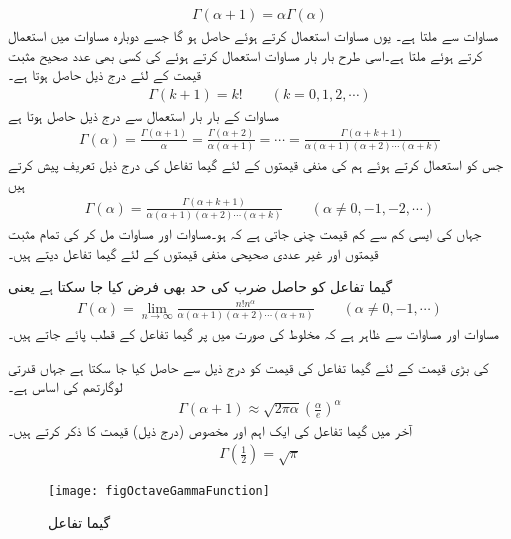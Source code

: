 \begin{align}\label{مساوات_ضمیمہ_گیما_تکمل_ب}
\Gamma(\alpha+1)=\alpha\Gamma(\alpha)
\end{align}
مساوات  سے  ملتا ہے۔ یوں مساوات  استعمال کرتے ہوئے  حاصل ہو گا جسے دوبارہ مساوات  میں استعمال کرتے ہوئے  ملتا ہے۔اسی طرح بار بار مساوات  استعمال کرتے ہوئے  کی کسی بھی عدد صحیح مثبت قیمت  کے لئے درج ذیل حاصل ہوتا ہے۔
\begin{align}\label{مساوات_ضمیمہ_گیما_تکمل_پ}
\Gamma(k+1)=k!\quad \quad (k=0,1,2,\cdots)
\end{align} 
مساوات  کے بار بار استعمال سے  درج ذیل حاصل ہوتا ہے
\begin{align*}
\Gamma(\alpha)=\frac{\Gamma(\alpha+1)}{\alpha}=\frac{\Gamma(\alpha+2)}{\alpha(\alpha+1)}=\cdots=\frac{\Gamma(\alpha+k+1)}{\alpha(\alpha+1)(\alpha+2)\cdots(\alpha+k)}
\end{align*}
جس کو استعمال کرتے ہوئے ہم  کی منفی قیمتوں کے لئے گیما تفاعل کی درج ذیل تعریف پیش کرتے ہیں
\begin{align}\label{مساوات_ضمیمہ_گیما_تکمل_ت}
\Gamma(\alpha)=\frac{\Gamma(\alpha+k+1)}{\alpha(\alpha+1)(\alpha+2)\cdots(\alpha+k)}\quad \quad (\alpha\ne 0, -1,-2,\cdots)
\end{align}
جہاں  کی ایسی کم سے کم قیمت چنی جاتی ہے کہ  ہو۔مساوات  اور مساوات  مل کر  کی تمام مثبت قیمتوں اور غیر عددی صحیحی منفی قیمتوں کے لئے گیما تفاعل دیتے ہیں۔

گیما تفاعل کو حاصل ضرب کی حد بھی فرض کیا جا سکتا ہے یعنی
\begin{align}\label{مساوات_ضمیمہ_گیما_تکمل_ٹ}
\Gamma(\alpha)=\lim_{n\to \infty} \frac{n! n^{\alpha}}{\alpha(\alpha+1)(\alpha+2)\cdots(\alpha+n)} \quad \quad (\alpha \ne 0, -1,\cdots)
\end{align}  
مساوات  اور مساوات  سے ظاہر ہے کہ مخلوط  کی صورت میں  پر گیما تفاعل کے قطب پائے جاتے ہیں۔

 کی بڑی قیمت کے لئے گیما تفاعل کی قیمت کو درج ذیل سے حاصل کیا جا سکتا ہے جہاں  قدرتی لوگارتھم کی اساس ہے۔
\begin{align}
\Gamma(\alpha+1)\approx \sqrt{2\pi \alpha}\left(\frac{\alpha}{e}\right)^\alpha
\end{align}
آخر میں گیما تفاعل کی ایک اہم اور مخصوص (درج ذیل) قیمت کا ذکر کرتے ہیں۔
\begin{align}
\Gamma\left(\frac{1}{2}\right)=\sqrt{\pi}
\end{align}
%
\begin{figure}
\centering
\texttt{[image: figOctaveGammaFunction]}
\caption{گیما تفاعل}
\label{شکل_ضمیمہ_مفید_گیما_تفاعل}
\end{figure}
%

